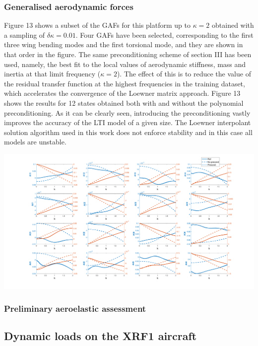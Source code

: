 \documentclass[11pt]{article}
\begin{document}
\subsubsection{Generalised aerodynamic forces}
\label{sec:orgd7bc12a}
Figure 13 shows a subset of the GAFs for this platform up to \(\kappa = 2\) obtained with a sampling of \(\delta \kappa = 0.01\). Four
GAFs have been selected, corresponding to the first three wing bending modes and the first torsional mode, and they are
shown in that order in the figure. The same preconditioning scheme of section III has been used, namely, the best fit
to the local values of aerodynamic stiffness, mass and inertia at that limit frequency (\(\kappa = 2\)). The effect of this is to
reduce the value of the residual transfer function at the highest frequencies in the training dataset, which accelerates
the convergence of the Loewner matrix approach. Figure 13 shows the results for 12 states obtained both with and
without the polynomial preconditioning. As it can be clearly seen, introducing the preconditioning vastly improves the
accuracy of the LTI model of a given size. The Loewner interpolant solution algorithm used in this work does not
enforce stability and in this case all models are unstable. 
\begin{center}
\includegraphics[width=.9\linewidth]{./img/dlm_precond.pdf}
\end{center}
\subsubsection{Preliminary aeroelastic assessment}
\label{sec:org7ca754f}

\subsection{Dynamic loads on the XRF1 aircraft}
\end{document}
